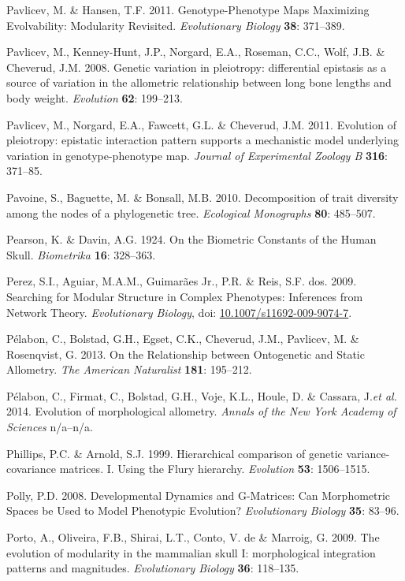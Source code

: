 \documentclass[12pt,twoside]{report}
\begin{document}
Pavlicev, M. \& Hansen, T.F. 2011. Genotype-Phenotype Maps Maximizing
Evolvability: Modularity Revisited. \emph{Evolutionary Biology}
\textbf{38}: 371--389.

Pavlicev, M., Kenney-Hunt, J.P., Norgard, E.A., Roseman, C.C., Wolf,
J.B. \& Cheverud, J.M. 2008. Genetic variation in pleiotropy:
differential epistasis as a source of variation in the allometric
relationship between long bone lengths and body weight. \emph{Evolution}
\textbf{62}: 199--213.

Pavlicev, M., Norgard, E.A., Fawcett, G.L. \& Cheverud, J.M. 2011.
Evolution of pleiotropy: epistatic interaction pattern supports a
mechanistic model underlying variation in genotype-phenotype map.
\emph{Journal of Experimental Zoology B} \textbf{316}: 371--85.

Pavoine, S., Baguette, M. \& Bonsall, M.B. 2010. Decomposition of trait
diversity among the nodes of a phylogenetic tree. \emph{Ecological
Monographs} \textbf{80}: 485--507.

Pearson, K. \& Davin, A.G. 1924. On the Biometric Constants of the Human
Skull. \emph{Biometrika} \textbf{16}: 328--363.

Perez, S.I., Aguiar, M.A.M., Guimarães Jr., P.R. \& Reis, S.F. dos.
2009. Searching for Modular Structure in Complex Phenotypes: Inferences
from Network Theory. \emph{Evolutionary Biology}, doi:
\href{http://dx.doi.org/10.1007/s11692-009-9074-7}{10.1007/s11692-009-9074-7}.

Pélabon, C., Bolstad, G.H., Egset, C.K., Cheverud, J.M., Pavlicev, M. \&
Rosenqvist, G. 2013. On the Relationship between Ontogenetic and Static
Allometry. \emph{The American Naturalist} \textbf{181}: 195--212.

Pélabon, C., Firmat, C., Bolstad, G.H., Voje, K.L., Houle, D. \&
Cassara, J.\emph{et al.} 2014. Evolution of morphological allometry.
\emph{Annals of the New York Academy of Sciences} n/a--n/a.

Phillips, P.C. \& Arnold, S.J. 1999. Hierarchical comparison of genetic
variance-covariance matrices. I. Using the Flury hierarchy.
\emph{Evolution} \textbf{53}: 1506--1515.

Polly, P.D. 2008. Developmental Dynamics and G-Matrices: Can
Morphometric Spaces be Used to Model Phenotypic Evolution?
\emph{Evolutionary Biology} \textbf{35}: 83--96.

Porto, A., Oliveira, F.B., Shirai, L.T., Conto, V. de \& Marroig, G.
2009. The evolution of modularity in the mammalian skull I:
morphological integration patterns and magnitudes. \emph{Evolutionary
Biology} \textbf{36}: 118--135.
\end{document}
